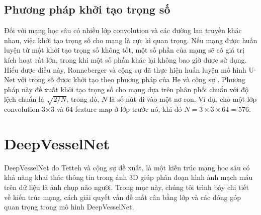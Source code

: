 \subsection{Phương pháp khởi tạo trọng số}
\label{subsec:phuong_phap_khoi_tao_trong_so}
	Đối với mạng học sâu có nhiều lớp convolution và các đường lan truyền khác nhau, việc khởi tạo trọng số cho mạng là cực kì quan trọng. Nếu mạng được huấn luyện từ một khởi tạo trọng số không tốt, một số phần của mạng sẽ có giá trị kích hoạt rất lớn, trong khi một số phần khác lại không bao giờ được sử dụng. Hiểu được điều này, Ronneberger và cộng sự đã thực hiện huấn luyện mô hình U-Net với trọng số được khởi tạo theo phương pháp của He và cộng sự \cite{he2015delving}. Phương pháp này đề xuất khởi tạo trọng số cho mạng dựa trên phân phối chuẩn với độ lệch chuẩn là $\sqrt{2 / N}$, trong đó, $N$ là số nút đi vào một nơ-ron. Ví dụ, cho một lớp convolution 3$\times$3 và 64 feature map ở lớp trước nó, khi đó $N = 3 \times 3 \times 64 = 576$.
	
\section{DeepVesselNet}
\label{sec:deep_vessel_net}
	DeepVesselNet do Tetteh và cộng sự \cite{tetteh2018deepvesselnet} đề xuất, là một kiến trúc mạng học sâu có khả năng khai thác thông tin trong ảnh 3D giúp phân đoạn hình ảnh mạch máu trên dữ liệu là ảnh chụp não người. Trong mục này, chúng tôi trình bày chi tiết về kiến trúc mạng, cách giải quyết vấn đề mất cân bằng lớp và các đóng góp quan trọng trong mô hình DeepVesselNet.
	
